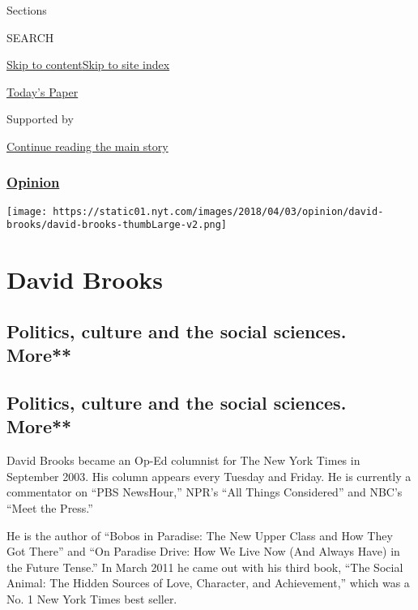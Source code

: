 Sections

SEARCH

\protect\hyperlink{site-content}{Skip to
content}\protect\hyperlink{site-index}{Skip to site index}

\href{https://myaccount.nytimes.com/auth/login?response_type=cookie\&client_id=vi}{}

\href{https://www.nytimes.com/section/todayspaper}{Today's Paper}

Supported by

\protect\hyperlink{after-sponsor}{Continue reading the main story}

\hypertarget{opinion}{%
\subsubsection{\texorpdfstring{\href{/section/opinion}{Opinion}}{Opinion}}\label{opinion}}

\texttt{[image: https://static01.nyt.com/images/2018/04/03/opinion/david-brooks/david-brooks-thumbLarge-v2.png]}

\hypertarget{david-brooks}{%
\section{David Brooks}\label{david-brooks}}

\hypertarget{politics-culture-and-the-social-sciences-more}{%
\subsection{Politics, culture and the social sciences.
More**}\label{politics-culture-and-the-social-sciences-more}}

\hypertarget{politics-culture-and-the-social-sciences-more-1}{%
\subsection{Politics, culture and the social sciences.
More**}\label{politics-culture-and-the-social-sciences-more-1}}

David Brooks became an Op-Ed columnist for The New York Times in
September 2003. His column appears every Tuesday and Friday. He is
currently a commentator on ``PBS NewsHour,'' NPR's ``All Things
Considered'' and NBC's ``Meet the Press.''

He is the author of ``Bobos in Paradise: The New Upper Class and How
They Got There'' and ``On Paradise Drive: How We Live Now (And Always
Have) in the Future Tense.'' In March 2011 he came out with his third
book, ``The Social Animal: The Hidden Sources of Love, Character, and
Achievement,'' which was a No. 1 New York Times best seller.

